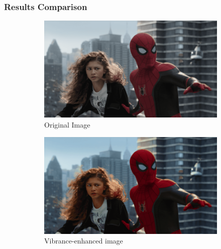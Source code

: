 \documentclass[11pt]{article}
\begin{document}
\subsubsection*{Results Comparison}
\begin{figure}[H]
    \centering
    \begin{subfigure}{0.33\textwidth}
        \includegraphics[width=\textwidth]{resources/spider.png}
        \caption{Original Image}
    \end{subfigure}
    \hfill
    \begin{subfigure}{0.33\textwidth}
        \includegraphics[width=\textwidth]{resources/spider_transformed.png}
        \caption{Vibrance-enhanced image}
    \end{subfigure}
    \hfill
    \begin{subfigure}{0.3\textwidth}

\end{subfigure}
\end{figure}
\end{document}
